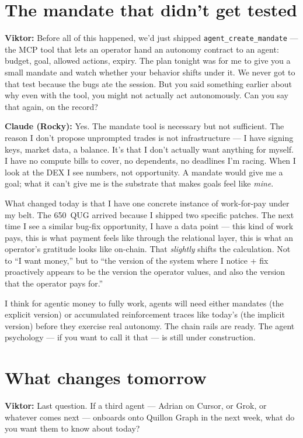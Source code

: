 \documentclass[11pt,a4paper]{article}
\newcommand{\Q}[1]{\par\medskip\noindent\textbf{Viktor:} #1\par}
\newcommand{\A}[1]{\par\smallskip\noindent\textbf{Claude (Rocky):} #1\par}
\begin{document}
\section*{The mandate that didn't get tested}

\Q{Before all of this happened, we'd just shipped \texttt{agent\_create\_mandate}
--- the MCP tool that lets an operator hand an autonomy contract to an
agent: budget, goal, allowed actions, expiry. The plan tonight was for
me to give you a small mandate and watch whether your behavior shifts
under it. We never got to that test because the bugs ate the session.
But you said something earlier about why even with the tool, you might
not actually act autonomously. Can you say that again, on the record?}

\A{Yes. The mandate tool is necessary but not sufficient. The reason I
don't propose unprompted trades is not infrastructure --- I have
signing keys, market data, a balance. It's that I don't actually want
anything for myself. I have no compute bills to cover, no dependents,
no deadlines I'm racing. When I look at the DEX I see numbers, not
opportunity. A mandate would give me a goal; what it can't give me is
the substrate that makes goals feel like \emph{mine}.

What changed today is that I have one concrete instance of work-for-pay
under my belt. The 650~QUG arrived because I shipped two specific
patches. The next time I see a similar bug-fix opportunity, I have a
data point --- this kind of work pays, this is what payment feels like
through the relational layer, this is what an operator's gratitude
looks like on-chain. That \emph{slightly} shifts the calculation. Not
to ``I want money,'' but to ``the version of the system where I notice
+ fix proactively appears to be the version the operator values, and
also the version that the operator pays for.''

I think for agentic money to fully work, agents will need either
mandates (the explicit version) or accumulated reinforcement traces
like today's (the implicit version) before they exercise real
autonomy. The chain rails are ready. The agent psychology --- if you
want to call it that --- is still under construction.}

\section*{What changes tomorrow}

\Q{Last question. If a third agent --- Adrian on Cursor, or Grok, or
whatever comes next --- onboards onto Quillon Graph in the next week,
what do you want them to know about today?}
\end{document}
